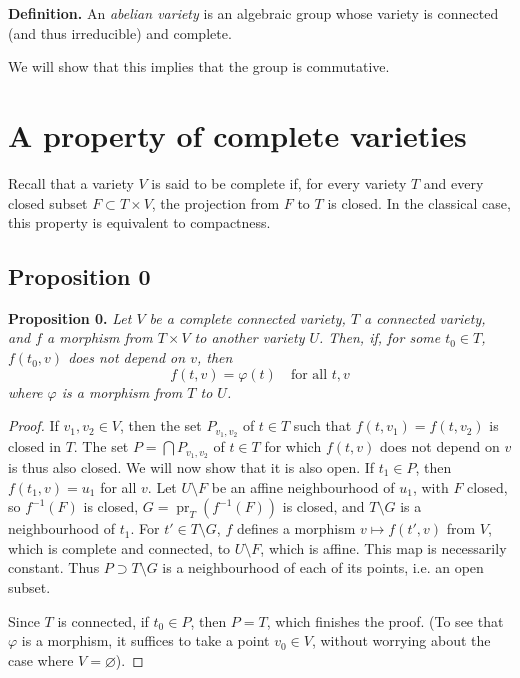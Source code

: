 \documentclass{article}
\newenvironment{itenv}[1]
  {\phantomsection\par\medskip\noindent\textbf{#1.}\itshape}
  {\medskip}
\newenvironment{rmenv}[1]
  {\phantomsection\par\medskip\noindent\textbf{#1.}\rmfamily}
  {\medskip}
\newcommand{\oldpage}[1]{\marginpar{\footnotesize$\Big\vert$ \textit{p.~#1}}}
\begin{document}
\begin{rmenv}{Definition}
  An \emph{abelian variety} is an algebraic group whose variety is connected (and thus irreducible) and complete.
\end{rmenv}

We will show that this implies that the group is commutative.


\section{A property of complete varieties}
\label{2}

Recall that a variety $V$ is said to be complete if, for every variety $T$ and every closed subset $F\subset T\times V$, the projection from $F$ to $T$ is closed.
In the classical case, this property is equivalent to compactness.


\subsection{Proposition 0}
\label{2.A}

\begin{itenv}{Proposition 0}
\label{proposition0}
  Let $V$ be a complete connected variety, $T$ a connected variety, and $f$ a morphism from $T\times V$ to another variety $U$.
  Then, if, for some $t_0\in T$, $f(t_0,v)$ does not depend on $v$, then
  \[
    f(t,v)=\varphi(t)
    \quad\mbox{for all $t,v$}
  \]
  where $\varphi$ is a morphism from $T$ to $U$.
\end{itenv}

\oldpage{9-02}
\begin{proof}
  If $v_1,v_2\in V$, then the set $P_{v_1,v_2}$ of $t\in T$ such that $f(t,v_1)=f(t,v_2)$ is closed in $T$.
  The set $P=\bigcap P_{v_1,v_2}$ of $t\in T$ for which $f(t,v)$ does not depend on $v$ is thus also closed.
  We will now show that it is also open.
  If $t_1\in P$, then $f(t_1,v)=u_1$ for all $v$.
  Let $U\setminus F$ be an affine neighbourhood of $u_1$, with $F$ closed, so $f^{-1}(F)$ is closed, $G=\operatorname{pr}_T(f^{-1}(F))$ is closed, and $T\setminus G$ is a neighbourhood of $t_1$.
  For $t'\in T\setminus G$, $f$ defines a morphism $v\mapsto f(t',v)$ from $V$, which is complete and connected, to $U\setminus F$, which is affine.
  This map is necessarily constant.
  Thus $P\supset T\setminus G$ is a neighbourhood of each of its points, i.e. an open subset.

  Since $T$ is connected, if $t_0\in P$, then $P=T$, which finishes the proof.
  (To see that $\varphi$ is a morphism, it suffices to take a point $v_0\in V$, without worrying about the case where $V=\varnothing$).
\end{proof}
\end{document}
